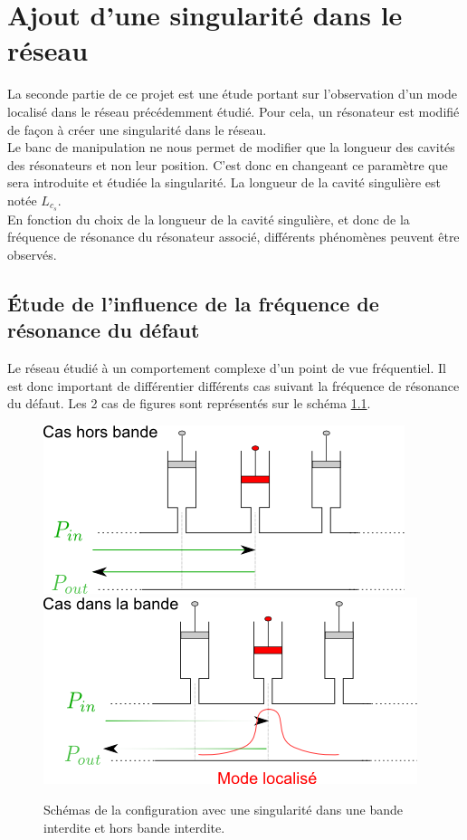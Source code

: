 \chapter{Ajout d'une singularité dans le réseau}
La seconde partie de ce projet est une étude portant sur l'observation d'un mode localisé dans le réseau précédemment étudié. Pour cela, un résonateur est modifié de façon à créer une singularité dans le réseau. \\


Le banc de manipulation ne nous permet de modifier que la longueur des cavités des résonateurs et non leur position. C'est donc en changeant ce paramètre que sera introduite et étudiée la singularité. La longueur de la cavité singulière est notée $L_{c_{s}}$.\\

En fonction du choix de la longueur de la cavité singulière, et donc de la fréquence de résonance du résonateur associé, différents phénomènes peuvent être observés. 

\section{Étude de l'influence de la fréquence de résonance du défaut}
Le réseau étudié à un comportement complexe d'un point de vue fréquentiel. Il est donc important de différentier différents cas suivant la fréquence de résonance du défaut. Les 2 cas de figures sont représentés sur le schéma \ref{schema_singu1}.

\begin{figure}[!h]
\centering
\includegraphics[scale=0.5]{images_chp2/schema_singu1.png} \hfill
\includegraphics[scale=0.5]{images_chp2/schema_singu2.png}
\caption{\label{schema_singu1} Schémas de la configuration avec une singularité dans une bande interdite  et hors bande interdite.}
\end{figure}



